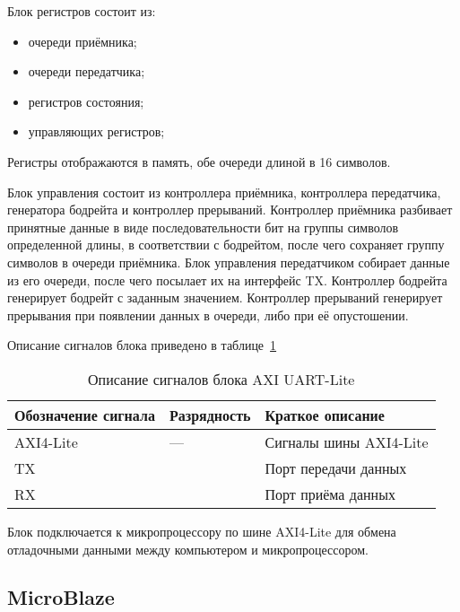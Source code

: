 Блок регистров состоит из:
\begin{itemize}
  \item очереди приёмника;
  \item очереди передатчика;
  \item регистров состояния;
  \item управляющих регистров;
\end{itemize}

Регистры отображаются в память, обе очереди длиной в 16 символов.

Блок управления состоит из контроллера приёмника, контроллера передатчика,
генератора бодрейта и контроллер прерываний. Контроллер приёмника разбивает
принятные данные в виде последовательности бит на группы символов определенной
длины, в соответствии с бодрейтом, после чего сохраняет группу символов в
очереди приёмника. Блок управления передатчиком собирает данные из его очереди,
после чего посылает их на интерфейс TX. Контроллер бодрейта генерирует
бодрейт с заданным значением. Контроллер прерываний генерирует прерывания при
появлении данных в очереди, либо при её опустошении.

Описание сигналов блока приведено в таблице~\ref{table:functional:axi_uart_lite:signals}

\begin{table}[ht!]
  \caption{Описание сигналов блока AXI UART-Lite}
  \label{table:functional:axi_uart_lite:signals}
  \begin{tabular}{| >{\centering}m{}
                  | >{\centering}m{}
                  | >{\centering\arraybackslash}m{}|}
   \hline
    Обозначение сигнала & Разрядность & Краткое описание \\
    \hline
    AXI4-Lite & --- & Сигналы шины AXI4-Lite \\
    \hline
    TX & 1 & Порт передачи данных \\
    \hline
    RX & 1 & Порт приёма данных \\
    \hline
  \end{tabular}
\end{table}

Блок подключается к микропроцессору по шине AXI4-Lite для обмена отладочными данными
между компьютером и микропроцессором.

\subsection{MicroBlaze}
\label{sec:functional:microblaze}

